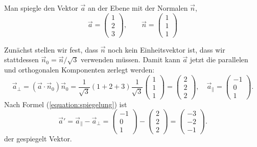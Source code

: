 \begin{beispiel}
Man spiegle den Vektor $\vec a$ an der Ebene mit der Normalen $\vec n$,
\[
\vec a=\begin{pmatrix}1\\2\\3\end{pmatrix},
\qquad
\vec n=\begin{pmatrix}1\\1\\1\end{pmatrix}
\]

\smallskip

{\parindent 0pt Zunächst stellen wir fest,} dass $\vec n$ noch
kein Einheitsvektor ist, dass wir stattdessen $\vec n_0=\vec n/\sqrt{3}$
verwenden müssen.
Damit kann $\vec a$ jetzt die parallelen und orthogonalen
Komponenten zerlegt werden:
\[
\vec a_{\perp}=(\vec a\cdot\vec n_0)\vec n_0
=\frac1{\sqrt{3}} (1+2+3)\frac1{\sqrt{3}}\begin{pmatrix}1\\1\\1\end{pmatrix}
=\begin{pmatrix}2\\2\\2\end{pmatrix},
\quad
\vec a_{\|}=\begin{pmatrix} -1\\0\\1 \end{pmatrix}.
\]
Nach Formel (\ref{equation:spiegelung}) ist
\[
\vec a'=\vec a_{\|}-\vec a_{\perp}
=
\begin{pmatrix}-1\\0\\1\end{pmatrix}-\begin{pmatrix}2\\2\\2\end{pmatrix}
=\begin{pmatrix}-3\\-2\\-1\end{pmatrix}.
\]
der gespiegelt Vektor.
\end{beispiel}

